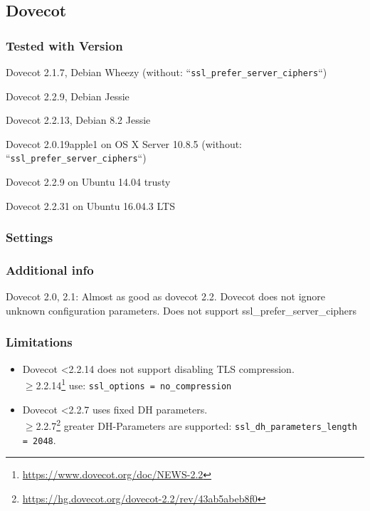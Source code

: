 \subsection{Dovecot}


\subsubsection{Tested with Version}
\begin{itemize*}
  \item Dovecot 2.1.7, Debian Wheezy (without: ``\texttt{ssl\_prefer\_server\_ciphers}``)
  \item Dovecot 2.2.9, Debian Jessie
  \item Dovecot 2.2.13, Debian 8.2 Jessie
  \item Dovecot 2.0.19apple1 on OS X Server 10.8.5 (without: ``\texttt{ssl\_prefer\_server\_ciphers}``)
  \item Dovecot 2.2.9 on Ubuntu 14.04 trusty
  \item Dovecot 2.2.31 on Ubuntu 16.04.3 LTS
\end{itemize*}

\subsubsection{Settings}


\subsubsection{Additional info}
Dovecot 2.0, 2.1: Almost as good as dovecot 2.2. Dovecot does not ignore unknown configuration parameters. Does not support
ssl\_prefer\_server\_ciphers

\subsubsection{Limitations}
\begin{itemize}
	\item Dovecot <2.2.14 does not support disabling TLS compression.\\
		{\(\geq\)2.2.14}\footnote{\url{https://www.dovecot.org/doc/NEWS-2.2}}
		use: \texttt{ssl\_options = no\_compression}
	\item Dovecot <2.2.7 uses fixed DH parameters.\\
		{\(\geq\)2.2.7}\footnote{\url{https://hg.dovecot.org/dovecot-2.2/rev/43ab5abeb8f0}}
		greater DH-Parameters are supported: \texttt{ssl\_dh\_parameters\_length = 2048}.
\end{itemize}

